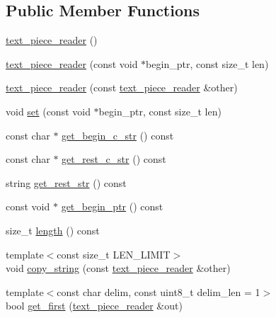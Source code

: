 \subsection*{Public Member Functions}
\begin{DoxyCompactItemize}
\item 
\hyperlink{classuva_1_1utils_1_1file_1_1text__piece__reader_ae04b4169c4468a42edb27d8b5b7018cd}{text\+\_\+piece\+\_\+reader} ()
\item 
\hyperlink{classuva_1_1utils_1_1file_1_1text__piece__reader_a2616daaddbb8066e34088a81c47b0e7d}{text\+\_\+piece\+\_\+reader} (const void $\ast$begin\+\_\+ptr, const size\+\_\+t len)
\item 
\hyperlink{classuva_1_1utils_1_1file_1_1text__piece__reader_a8b60daf81713d014523d2292b23eab86}{text\+\_\+piece\+\_\+reader} (const \hyperlink{classuva_1_1utils_1_1file_1_1text__piece__reader}{text\+\_\+piece\+\_\+reader} \&other)
\item 
void \hyperlink{classuva_1_1utils_1_1file_1_1text__piece__reader_aaf9517c75f1e8f7b3aa0b9cd9821bc2f}{set} (const void $\ast$begin\+\_\+ptr, const size\+\_\+t len)
\item 
const char $\ast$ \hyperlink{classuva_1_1utils_1_1file_1_1text__piece__reader_a1c24939f120f9b7818a6cb884c486020}{get\+\_\+begin\+\_\+c\+\_\+str} () const 
\item 
const char $\ast$ \hyperlink{classuva_1_1utils_1_1file_1_1text__piece__reader_af6e5a8dfaa071f5692a78d1b959ba1e4}{get\+\_\+rest\+\_\+c\+\_\+str} () const 
\item 
string \hyperlink{classuva_1_1utils_1_1file_1_1text__piece__reader_a221fecba5ec2d04c86be6814d311fbb7}{get\+\_\+rest\+\_\+str} () const 
\item 
const void $\ast$ \hyperlink{classuva_1_1utils_1_1file_1_1text__piece__reader_a21bf0ace15b034702fb174f7cd67bae5}{get\+\_\+begin\+\_\+ptr} () const 
\item 
size\+\_\+t \hyperlink{classuva_1_1utils_1_1file_1_1text__piece__reader_a4a61cb75d8768f737c8fdc0c0ca11996}{length} () const 
\item 
{\footnotesize template$<$const size\+\_\+t L\+E\+N\+\_\+\+L\+I\+M\+I\+T$>$ }\\void \hyperlink{classuva_1_1utils_1_1file_1_1text__piece__reader_a0ea45fa120ff8d3640422a29bf6e9df4}{copy\+\_\+string} (const \hyperlink{classuva_1_1utils_1_1file_1_1text__piece__reader}{text\+\_\+piece\+\_\+reader} \&other)
\item 
{\footnotesize template$<$const char delim, const uint8\+\_\+t delim\+\_\+len = 1$>$ }\\bool \hyperlink{classuva_1_1utils_1_1file_1_1text__piece__reader_abca7fc6d707aa7cbb70cab26faad41fd}{get\+\_\+first} (\hyperlink{classuva_1_1utils_1_1file_1_1text__piece__reader}{text\+\_\+piece\+\_\+reader} \&out)

\end{DoxyCompactItemize}
